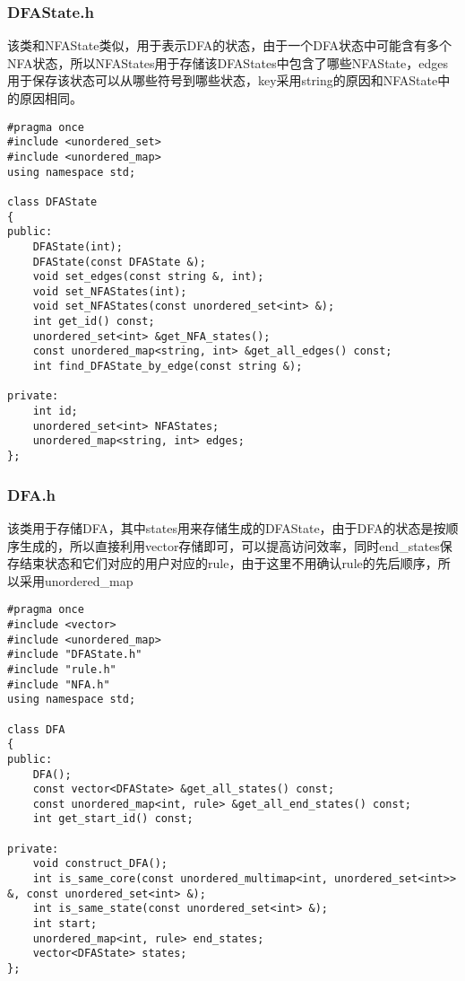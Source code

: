 \subsubsection{DFAState.h}
该类和NFAState类似，用于表示DFA的状态，由于一个DFA状态中可能含有多个NFA状态，所以NFAStates用于存储该DFAStates中包含了哪些NFAState，edges用于保存该状态可以从哪些符号到哪些状态，key采用string的原因和NFAState中的原因相同。
\lstset{language=C++}
\begin{lstlisting}
#pragma once
#include <unordered_set>
#include <unordered_map>
using namespace std;

class DFAState
{
public:
    DFAState(int);
    DFAState(const DFAState &);
    void set_edges(const string &, int);
    void set_NFAStates(int);
    void set_NFAStates(const unordered_set<int> &);
    int get_id() const;
    unordered_set<int> &get_NFA_states();
    const unordered_map<string, int> &get_all_edges() const;
    int find_DFAState_by_edge(const string &);

private:
    int id;
    unordered_set<int> NFAStates;
    unordered_map<string, int> edges;
};

\end{lstlisting}
\subsubsection{DFA.h}
该类用于存储DFA，其中states用来存储生成的DFAState，由于DFA的状态是按顺序生成的，所以直接利用vector存储即可，可以提高访问效率，同时end\_states保存结束状态和它们对应的用户对应的rule，由于这里不用确认rule的先后顺序，所以采用unordered\_map
\lstset{language=C++}
\begin{lstlisting}
#pragma once
#include <vector>
#include <unordered_map>
#include "DFAState.h"
#include "rule.h"
#include "NFA.h"
using namespace std;

class DFA
{
public:
    DFA();
    const vector<DFAState> &get_all_states() const;
    const unordered_map<int, rule> &get_all_end_states() const;
    int get_start_id() const;

private:
    void construct_DFA();
    int is_same_core(const unordered_multimap<int, unordered_set<int>> &, const unordered_set<int> &);
    int is_same_state(const unordered_set<int> &);
    int start;
    unordered_map<int, rule> end_states;
    vector<DFAState> states;
};
\end{lstlisting}
